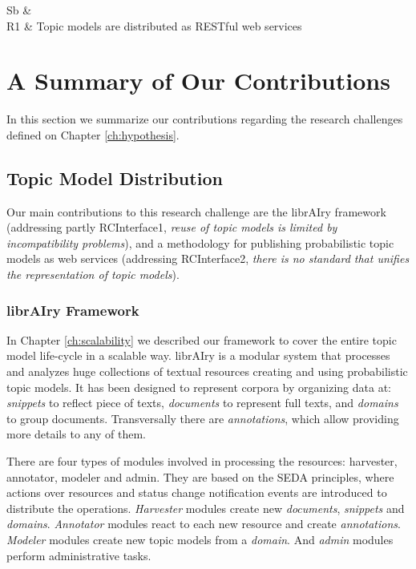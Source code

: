 \begin{table}[!htbp]
\centering%
\begin{tabularx}{\linewidth}{Sb}
\toprule
{} &  \\
\midrule
\midrule
R1 & Topic models are distributed as RESTful web services\\
\bottomrule
\end{tabularx}
\caption{Restrictions considered in this thesis.}
\label{table:rectrictions}
\end{table}

\section{A Summary of Our Contributions}

In this section we summarize our contributions regarding the research challenges defined on Chapter \ref{ch:hypothesis}.


\subsection{Topic Model Distribution}
Our main contributions to this research challenge are the librAIry framework (addressing partly RCInterface1, \textit{reuse of topic models is limited by incompatibility problems}), and a methodology for publishing probabilistic topic models as web services (addressing RCInterface2, \textit{there is no standard that unifies the representation of topic models}).

\subsubsection{librAIry Framework}

In Chapter \ref{ch:scalability} we described our framework to cover the entire topic model life-cycle in a scalable way. librAIry is a modular system that processes and analyzes huge collections of textual resources creating and using probabilistic topic models. It has been designed to represent corpora by organizing data at: \textit{snippets} to reflect piece of texts, \textit{documents} to represent full texts, and \textit{domains} to group documents. Transversally there are \textit{annotations}, which allow providing more details to any of them.

There are four types of modules involved in processing the resources: harvester, annotator, modeler and admin. They are based on the SEDA principles, where actions over resources and status change notification events are introduced to distribute the operations. \textit{Harvester} modules create new \textit{documents}, \textit{snippets} and \textit{domains}. \textit{Annotator} modules react to each new resource and create \textit{annotations}. \textit{Modeler} modules create new topic models from a \textit{domain}. And \textit{admin} modules perform administrative tasks.

